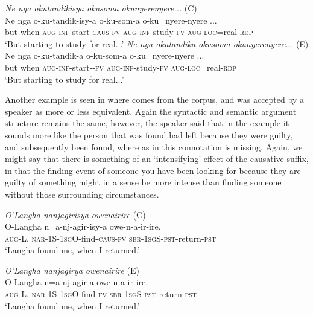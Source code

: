 \documentclass[output=paper,colorlinks,citecolor=brown,draftmode]{langscibook}
\begin{document}
\ea
\begin{xlist}   \label{ex:Saebo:intense}
 \ex \label{ex:Saebo:intenseA} \emph{Ne nga 		okutandikisya 		okusoma 	okunyerenyere...} (C)\\
  \gll  Ne nga 		o-ku-tandik-isy-a 		o-ku-som-a 	o-ku=nyere-nyere ... \\ 
but when \textsc{aug-inf}-start-\textsc{caus-fv} \textsc{aug-inf}-study-\textsc{fv} \textsc{aug-loc}=real-\textsc{rdp}\\
    \glt  `But starting to study for real...' 
      \ex \label{ex:Saebo:intenseB} \emph{Ne nga okutandika okusoma okunyerenyere...} (E)\\
  \gll  Ne nga o-ku-tandik-a o-ku-som-a o-ku=nyere-nyere ... \\ 
but when \textsc{aug-inf}-start-\textsc{-fv} \textsc{aug-inf}-study-\textsc{fv} \textsc{aug-loc}=real-\textsc{rdp}\\
    \glt  `But starting to study for real...' 
      \end{xlist}     
      \z

Another example is seen in  where  comes from the corpus, and  was accepted by a speaker as more or less equivalent. Again the syntactic and semantic argument structure remains the same, however, the speaker said that in the  example it sounds more like the person that was found had left because they were guilty, and subsequently been found, where as in  this connotation is missing. Again, we might say that there is something of an `intensifying' effect of the causative suffix, in that the finding event of someone you have been looking for because they are guilty of something might in a sense be more intense than finding someone without those surrounding circumstances. 

\ea
\begin{xlist}   \label{ex:Saebo:find}
 \ex \label{ex:Saebo:findA} \emph{O'Langha nanjagirisya owenairire} (C)\\
  \gll  O-Langha n=a-nj-agir-isy-a owe-n-a-ir-ire. \\ 
\textsc{aug}-L. \textsc{nar-}1S-1\textsc{sg}O-find-\textsc{caus-fv} \textsc{sbr-1sg}S-\textsc{pst}-return-\textsc{pst}       \\
    \glt  `Langha found me, when I returned.' 

     \ex \label{ex:Saebo:findB} \emph{O'Langha nanjagirya owenairire} (E)\\
  \gll  O-Langha n=a-nj-agir-a owe-n-a-ir-ire. \\ 
\textsc{aug}-L. \textsc{nar-}1S-1\textsc{sg}O-find-\textsc{fv} \textsc{sbr-1sg}S-\textsc{pst}-return-\textsc{pst}   \\
    \glt  `Langha found me, when I returned.' 
      \end{xlist}     
      \z
\end{document}
